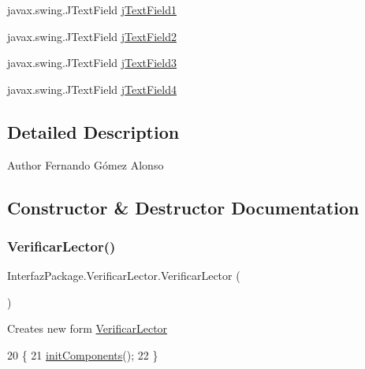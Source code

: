 \begin{DoxyCompactItemize}
\item 
javax.\+swing.\+J\+Text\+Field \mbox{\hyperlink{class_interfaz_package_1_1_verificar_lector_a7c056e1870eb31ca108b4da56a7d93f4}{j\+Text\+Field1}}
\item 
javax.\+swing.\+J\+Text\+Field \mbox{\hyperlink{class_interfaz_package_1_1_verificar_lector_a3f80f83121eebb36d3c494a791ae2e00}{j\+Text\+Field2}}
\item 
javax.\+swing.\+J\+Text\+Field \mbox{\hyperlink{class_interfaz_package_1_1_verificar_lector_a0fb6ae08627a62444fca7c09e992446d}{j\+Text\+Field3}}
\item 
javax.\+swing.\+J\+Text\+Field \mbox{\hyperlink{class_interfaz_package_1_1_verificar_lector_a782676dc9af3fa99d3a06020501824f7}{j\+Text\+Field4}}
\end{DoxyCompactItemize}


\subsection{Detailed Description}
\begin{DoxyAuthor}{Author}
Fernando Gómez Alonso 
\end{DoxyAuthor}


\subsection{Constructor \& Destructor Documentation}
\mbox{\label{class_interfaz_package_1_1_verificar_lector_a417a34478f55e6f453adbbb351381962}} 
\subsubsection{\texorpdfstring{Verificar\+Lector()}{VerificarLector()}}
{\footnotesize\ttfamily Interfaz\+Package.\+Verificar\+Lector.\+Verificar\+Lector (\begin{DoxyParamCaption}{ }\end{DoxyParamCaption})\hspace{0.3cm}{\ttfamily [inline]}}

Creates new form \mbox{\hyperlink{class_interfaz_package_1_1_verificar_lector}{Verificar\+Lector}} 
\begin{DoxyCode}
20                              \{
21         \mbox{\hyperlink{class_interfaz_package_1_1_verificar_lector_ab5abc778d7b6eb2a5799d72d9653e5f6}{initComponents}}();
22     \}
\end{DoxyCode}


